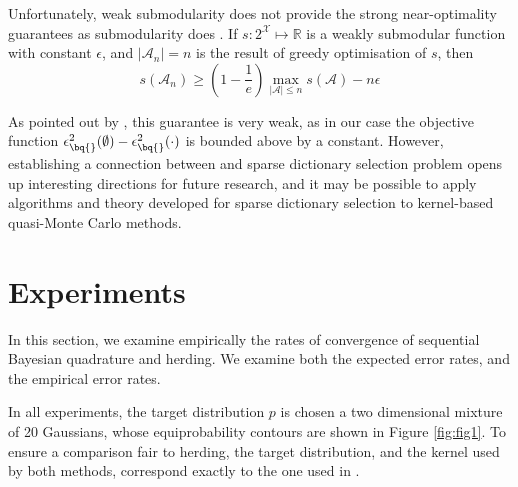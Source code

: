 Unfortunately, weak submodularity does not provide the strong near-optimality guarantees as submodularity does . If $s:2^\mathcal{X} \mapsto \mathbb{R}$ is a weakly submodular function with constant $\epsilon$, and $\vert\mathcal{A}_n\vert=n$ is the result of greedy optimisation of $s$, then
\begin{equation}
	s(\mathcal{A}_n) \geq \left(1-\frac{1}{e}\right)\max_{\vert\mathcal{A}\vert\leq n}s(\mathcal{A}) - n\epsilon
\end{equation}

As pointed out by \citet{KrauseCevher10}, this guarantee is very weak, as in our case the objective function $\epsilon^{2}_{\bq{}}(\emptyset)-\epsilon^{2}_{\bq{}}(\cdot)$ is bounded above by a constant. However, establishing a connection between \sbq{} and sparse dictionary selection problem opens up interesting directions for future research, and it may be possible to apply algorithms and theory developed for sparse dictionary selection to kernel-based quasi-Monte Carlo methods.


\section{Experiments}\label{sec:herding_experiments}

In this section, we examine empirically the rates of convergence of sequential Bayesian quadrature and herding. We examine both the expected error rates, and the empirical error rates.

In all experiments, the target distribution $p$ is chosen a two dimensional mixture of 20 Gaussians, whose equiprobability contours are shown in Figure \ref{fig:fig1}. To ensure a comparison fair to herding, the target distribution, and the kernel used by both methods, correspond exactly to the one used in \citep[Fig.\ 1]{chen2010super}.

